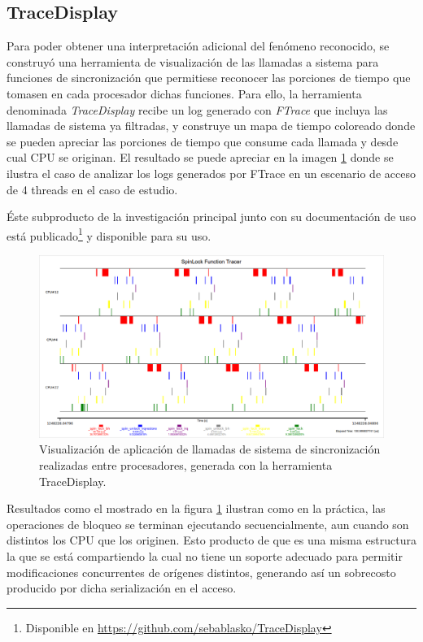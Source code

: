 \subsection{TraceDisplay}
Para poder obtener una interpretación adicional del fenómeno reconocido, se construyó una herramienta de visualización de las llamadas a sistema para funciones de sincronización que permitiese reconocer las porciones de tiempo que tomasen en cada procesador dichas funciones. Para ello, la herramienta denominada \emph{TraceDisplay} recibe un log generado con \emph{FTrace} que incluya las llamadas de sistema ya filtradas, y construye un mapa de tiempo coloreado donde se pueden apreciar las porciones de tiempo que consume cada llamada y desde cual CPU se originan. El resultado se puede apreciar en la imagen \ref{fig:traceDisplay} donde se ilustra el caso de analizar los logs generados por FTrace en un escenario de acceso de 4 threads en el caso de estudio.

Éste subproducto de la investigación principal junto con su documentación de uso está publicado\footnote{Disponible en \url{https://github.com/sebablasko/TraceDisplay}} y disponible para su uso.

\begin{figure}[!h]
	\centering
	\includegraphics[scale=0.34]{imagenes/traceVisualization.png}
	\caption{Visualización de aplicación de llamadas de sistema de sincronización realizadas entre procesadores, generada con la herramienta TraceDisplay.}
	\label{fig:traceDisplay}
\end{figure}

Resultados como el mostrado en la figura \ref{fig:traceDisplay} ilustran como en la práctica, las operaciones de bloqueo se terminan ejecutando secuencialmente, aun cuando son distintos los CPU que los originen. Esto producto de que es una misma estructura la que se está compartiendo la cual no tiene un soporte adecuado para permitir modificaciones concurrentes de orígenes distintos, generando así un sobrecosto producido por dicha serialización en el acceso.


